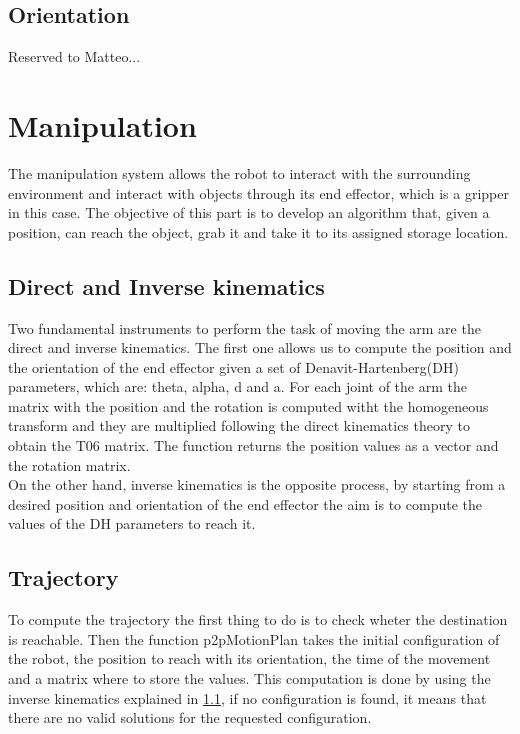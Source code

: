 \documentclass[12pt,a4paper]{article}
\begin{document}
\subsection{Orientation}\label{subsec:orientation}
Reserved to Matteo...

\section{Manipulation}\label{sec:manipulation}
The manipulation system allows the robot to interact with the surrounding environment and interact with objects through its end effector, which is a gripper in this case.
The objective of this part is to develop an algorithm that, given a position, can reach the object, grab it and take it to its assigned storage location.
\subsection{Direct and Inverse kinematics}\label{subsec:kinematics}
Two fundamental instruments to perform the task of moving the arm are the direct and inverse kinematics. The first one allows us to compute the position and the orientation of the end effector given a set of Denavit-Hartenberg(DH) parameters, which are: theta, alpha, d and a. For each joint of the arm the matrix with the position and the rotation is computed witht the homogeneous transform and they are multiplied following the direct kinematics theory to obtain the T06 matrix. The function returns the position values as a vector and the rotation matrix.\\
On the other hand, inverse kinematics is the opposite process, by starting from a desired position and orientation of the end effector the aim is to compute the values of the DH parameters to reach it.

\subsection{Trajectory}\label{subsec:trajectory}
To compute the trajectory the first thing to do is to check wheter the destination is reachable. Then the function p2pMotionPlan takes the initial configuration of the robot, the position to reach with its orientation, the time of the movement and a matrix where to store the values. This computation is done by using the inverse kinematics explained in \ref{subsec:kinematics}, if no configuration is found, it means that there are no valid solutions for the requested configuration.
\end{document}
